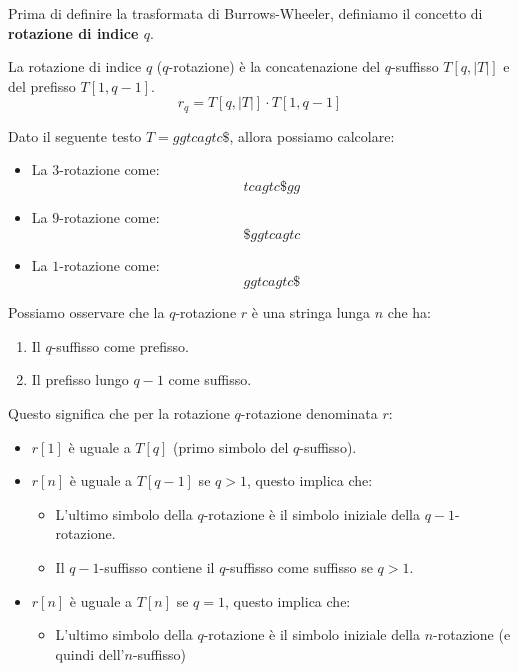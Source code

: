 Prima di definire la trasformata di Burrows-Wheeler, definiamo il concetto di
\textbf{rotazione di indice $q$}.
\begin{definizione}
    La rotazione di indice $q$ ($q$-rotazione) è la concatenazione del
    $q$-suffisso $T[q, |T|]$ e del prefisso $T[1, q - 1]$.
    \begin{equation}
        r_q = T[q, |T|] \cdot T[1, q - 1]
    \end{equation}
\end{definizione}
\begin{esempio}
    Dato il seguente testo $T = ggtcagtc\$$, allora possiamo calcolare:
    \begin{itemize}
        \item La $3$-rotazione come: $$tcagtc\$gg$$
        \item La $9$-rotazione come: $$\$ggtcagtc$$
        \item La $1$-rotazione come: $$ggtcagtc\$$$
    \end{itemize}
\end{esempio}
Possiamo osservare che la $q$-rotazione $r$ è una stringa lunga $n$ che ha:
\begin{enumerate}
    \item Il $q$-suffisso come prefisso.
    \item Il prefisso lungo $q - 1$ come suffisso.
\end{enumerate}
Questo significa che per la rotazione $q$-rotazione denominata $r$:
\begin{itemize}
    \item $r[1]$ è uguale a $T[q]$ (primo simbolo del $q$-suffisso).
    \item $r[n]$ è uguale a $T[q - 1]$ se $q > 1$, questo implica che:
          \begin{itemize}
              \item L'ultimo simbolo della $q$-rotazione è il simbolo iniziale
                    della $q - 1$-rotazione.
              \item Il $q - 1$-suffisso contiene il $q$-suffisso come suffisso
                    se $q > 1$.
          \end{itemize}
    \item $r[n]$ è uguale a $T[n]$ se $q = 1$, questo implica che:
          \begin{itemize}
              \item L'ultimo simbolo della $q$-rotazione è il simbolo iniziale
                    della $n$-rotazione (e quindi dell'$n$-suffisso)
          \end{itemize}
\end{itemize}
